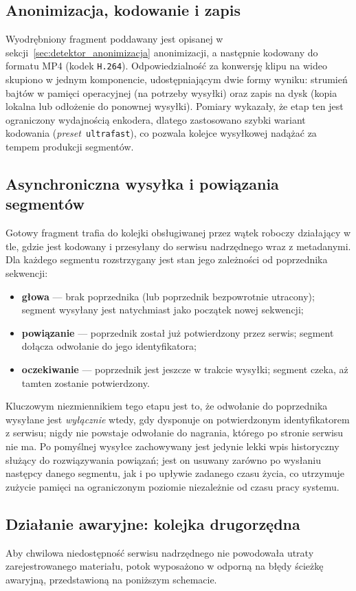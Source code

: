 \subsection{Anonimizacja, kodowanie i zapis}
Wyodrębniony fragment poddawany jest opisanej w sekcji~\ref{sec:detektor_anonimizacja} anonimizacji, a następnie kodowany do formatu MP4 (kodek \texttt{H.264}). Odpowiedzialność za konwersję klipu na wideo skupiono w jednym komponencie, udostępniającym dwie formy wyniku: strumień bajtów w pamięci operacyjnej (na potrzeby wysyłki) oraz zapis na dysk (kopia lokalna lub odłożenie do ponownej wysyłki). Pomiary wykazały, że etap ten jest ograniczony wydajnością enkodera, dlatego zastosowano szybki wariant kodowania (\textit{preset}~\texttt{ultrafast}), co pozwala kolejce wysyłkowej nadążać za tempem produkcji segmentów.

\subsection{Asynchroniczna wysyłka i powiązania segmentów}
Gotowy fragment trafia do kolejki obsługiwanej przez wątek roboczy działający w tle, gdzie jest kodowany i przesyłany do serwisu nadrzędnego wraz z metadanymi. Dla każdego segmentu rozstrzygany jest stan jego zależności od poprzednika sekwencji:
\begin{itemize}
    \item \textbf{głowa} --- brak poprzednika (lub poprzednik bezpowrotnie utracony); segment wysyłany jest natychmiast jako początek nowej sekwencji;
    \item \textbf{powiązanie} --- poprzednik został już potwierdzony przez serwis; segment dołącza odwołanie do jego identyfikatora;
    \item \textbf{oczekiwanie} --- poprzednik jest jeszcze w trakcie wysyłki; segment czeka, aż tamten zostanie potwierdzony.
\end{itemize}
Kluczowym niezmiennikiem tego etapu jest to, że odwołanie do poprzednika wysyłane jest \emph{wyłącznie} wtedy, gdy dysponuje on potwierdzonym identyfikatorem z serwisu; nigdy nie powstaje odwołanie do nagrania, którego po stronie serwisu nie ma. Po pomyślnej wysyłce zachowywany jest jedynie lekki wpis historyczny służący do rozwiązywania powiązań; jest on usuwany zarówno po wysłaniu następcy danego segmentu, jak i po upływie zadanego czasu życia, co utrzymuje zużycie pamięci na ograniczonym poziomie niezależnie od czasu pracy systemu.

\subsection{Działanie awaryjne: kolejka drugorzędna}\label{subsec:detektor_awaria}
Aby chwilowa niedostępność serwisu nadrzędnego nie powodowała utraty zarejestrowanego materiału, potok wyposażono w odporną na błędy ścieżkę awaryjną, przedstawioną na poniższym schemacie.

